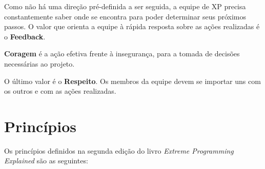 \documentclass[a4paper,12pt,font=plain,header=plain]{abnt}
\begin{document}
    Como não há uma direção pré-definida a ser seguida, a equipe de XP precisa constantemente saber onde se encontra para poder determinar seus próximos passos. O valor que orienta a equipe à rápida resposta sobre as ações realizadas é o \textbf{Feedback}.

    \textbf{Coragem} é a ação efetiva frente à insegurança, para a tomada de decisões necessárias ao projeto.

    O último valor é o \textbf{Respeito}. Os membros da equipe devem se importar uns com os outros e com as ações realizadas.

  \section{Princípios}

    Os princípios definidos na segunda edição do livro \textit{Extreme Programming Explained}\cite{beck04} são as seguintes:
\end{document}
